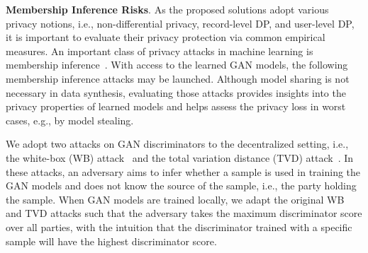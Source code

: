 \documentclass[conference]{IEEEtran}
\newcommand{\partitle}[1]{\smallskip \noindent \textbf{#1}.}
\begin{document}
\partitle{Membership Inference Risks}
As the proposed solutions adopt various privacy notions, i.e., non-differential privacy, record-level DP, and user-level DP, it is important to evaluate their privacy protection via common empirical measures. An important class of privacy attacks in machine learning is membership inference~\cite{ShokriMemML2016, ChenGANLeaks_2020}. With access to the learned GAN models, the following membership inference attacks may be launched. Although model sharing is not necessary in data synthesis, evaluating those attacks provides insights into the privacy properties of learned models and helps assess the privacy loss in worst cases, e.g., by model stealing. 

We adopt two attacks on GAN discriminators to the decentralized setting, i.e., the white-box (WB) attack~\cite{WBAttack2018} and the total variation distance (TVD) attack~\cite{PrivGAN2019}. In these attacks, an adversary aims to infer whether a sample is used in training the GAN models and does not know the source of the sample, i.e., the party holding the sample.  When GAN models are trained locally, we adapt the original WB and TVD attacks such that the adversary takes the maximum discriminator score over all parties, with the intuition that the discriminator trained with a specific sample will have the highest discriminator score. 


\end{document}
